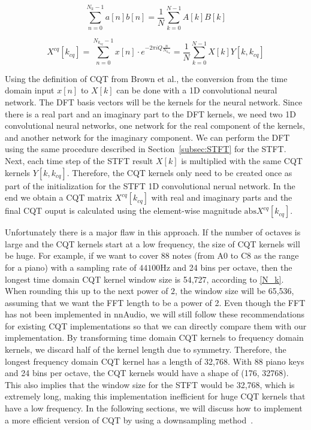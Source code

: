 \documentclass{ieeeaccess}
\begin{document}
\begin{equation}
    \sum_{n=0}^{N_k-1}a[n]b[n] = \frac{1}{N}\sum_{k=0}^{N-1}A[k]B[k]
    \label{Parseval}
\end{equation}

\begin{equation}
    X^{cq}[k_{cq}]= \sum_{n=0}^{N_{k_{cq}}-1}x[n]\cdot e^{-2\pi i Q \frac{n}{N_{k_{cq}}}} = \frac{1}{N}\sum_{k=0}^{N-1}X[k]Y[k, k_{cq}]
    \label{CQT1992}
\end{equation}




Using the definition of CQT from Brown et al., the conversion from the time domain input $x[n]$ to $X[k]$ can be done with a 1D convolutional neural network. The DFT basis vectors will be the kernels for the neural network. Since there is a real part and an imaginary part to the DFT kernels, we need two 1D convolutional neural networks, one network for the real component of the kernels, and another network for the imaginary component. We can perform the DFT using the same procedure described in Section~\ref{subsec:STFT} for the STFT. Next, each time step of the STFT result $X[k]$ is multiplied with the same CQT kernels $Y[k, k_{cq}]$. Therefore, the CQT kernels only need to be created once as part of the initialization for the STFT 1D convolutional nerual network. In the end we obtain a CQT matrix $X^{cq}[k_{cq}]$ with real and imaginary parts and the final CQT ouput is calculated using the element-wise magnitude $\text{abs}{X^{cq}[k_{cq}]}$.


Unfortunately there is a major flaw in this approach. If the number of octaves is large and the CQT kernels start at a low frequency, the size of CQT kernels will be huge. For example, if we want to cover 88 notes (from A0 to C8 as the range for a piano) with a sampling rate of $44100$Hz and 24 bins per octave, then the longest time domain CQT kernel window size is 54,727, according to \eqref{N_k}. When rounding this up to the next power of $2$, the window size will be 65,536, assuming that we want the FFT length to be a power of 2. %
Even though the FFT has not been implemented in nnAudio, we will still follow these recommendations for existing CQT implementations so that we can directly compare them with our implementation. By transforming time domain CQT kernels to frequency domain kernels, we discard half of the kernel length due to symmetry. Therefore, the longest frequency domain CQT kernel has a length of 32,768. With 88 piano keys and 24 bins per octave, the CQT kernels would have a shape of (176, 32768). This also implies that the window size for the STFT would be 32,768, which is extremely long, making this implementation inefficient for huge CQT kernels that have a low frequency. In the following sections, we will discuss how to implement a more efficient version of CQT by using a downsampling method~\cite{brown1991calculation}.
\end{document}

